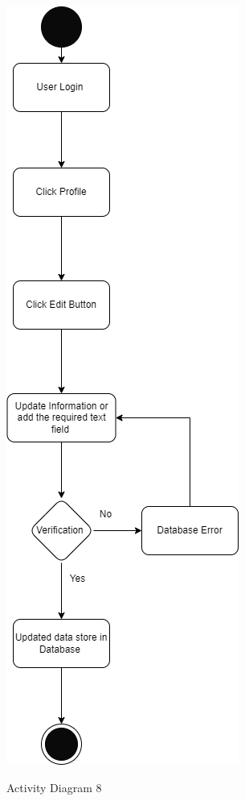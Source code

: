 \begin{figure}[H]
    \centering
    \caption{Activity Diagram 8}
    \includegraphics[scale=0.5]{./diagrams/Activity Diagram/ad-08.png}
    \label{fig:act-08}

\end{figure}


